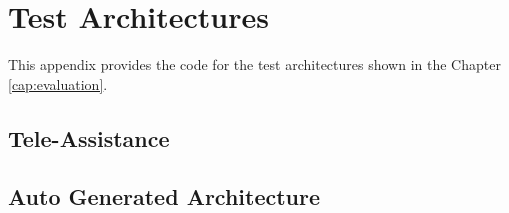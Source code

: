 \chapter{Test Architectures}
\label{app:test-arch}
This appendix provides the code for the test architectures shown in the Chapter \ref{cap:evaluation}.

\section{Tele-Assistance}

\clearpage
\section{Auto Generated Architecture}

